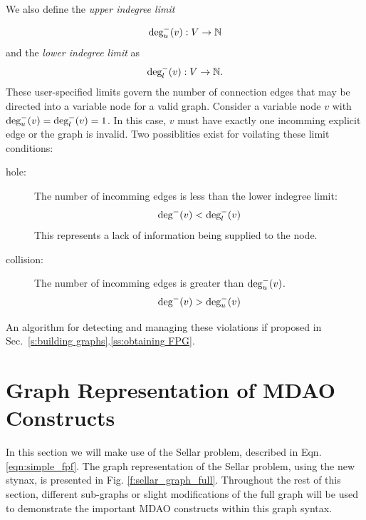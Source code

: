   We also define the \emph{upper indegree limit} 

  \begin{equation}
  \textrm{deg}_u^-(v):V \to \mathbb{N}
  \end{equation} 
  and the \emph{lower indegree limit} as
  \begin{equation}
  \textrm{deg}_l^-(v):V \to \mathbb{N}.
  \end{equation}
  These user-specified limits govern the number of connection edges that may 
  be directed into a variable node for a valid graph. Consider a variable 
  node $v$ with $\textrm{deg}_u^-(v) = \textrm{deg}_l^-(v) = 1$. In this case, $v$ 
  must have exactly one incomming explicit edge or the graph is invalid. 
  Two possiblities exist for voilating these limit conditions: 

  \begin{description}
    \item[hole: ] The number of incomming edges is less than the lower indegree limit:
      \begin{equation} \textrm{deg}^-(v) < \textrm{deg}_l^-(v) \label{e:hole} \end{equation}
      This represents a lack of information being supplied to the node.
    \item[collision: ] The number of incomming edges is greater than $ \textrm{deg}_u^-(v)$. 
      \begin{equation} \textrm{deg}^-(v) > \textrm{deg}_u^-(v) \label{e:collision}\end{equation}
  \end{description} 

  An algorithm for detecting and managing these violations if proposed in Sec.~\ref{s:building graphs}.\ref{ss:obtaining FPG}.

\section{Graph Representation of MDAO Constructs}
\label{s:graph representation}
In this section we will make use of the Sellar problem, described in 
Eqn. \ref{eqn:simple_fpf}. The graph representation of the Sellar problem, 
using the new stynax, is presented in Fig. \ref{f:sellar_graph_full}. Throughout
the rest of this section, different sub-graphs or slight modifications of 
the full graph will be used to demonstrate the important MDAO constructs within
this graph syntax.

